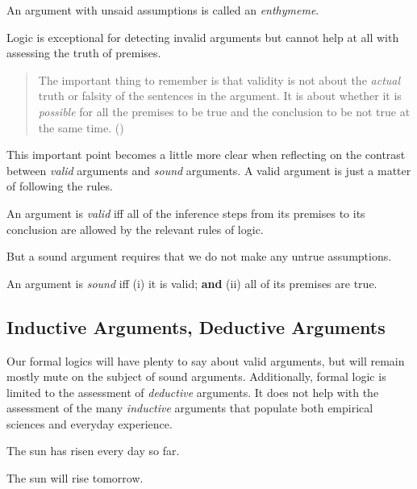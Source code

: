 \begin{definition}[Enthymeme]
  \label{def:enthymeme}
  An argument with unsaid assumptions is called an \emph{enthymeme}.
\end{definition}

Logic is exceptional for detecting invalid arguments but cannot help at all with
assessing the truth of premises.

\begin{quote}
  The important thing to remember is that validity is not about the
  \emph{actual} truth or falsity of the sentences in the argument. It is about
  whether it is \emph{possible} for all the premises to be true and the
  conclusion to be not true at the same time. (\cite[][p15]{Mag25})
\end{quote}

This important point becomes a little more clear when reflecting on the contrast
between \emph{valid} arguments and \emph{sound} arguments. A valid argument
is just a matter of following the rules.

\begin{definition}
  An argument is \emph{valid} iff all of the inference steps from its premises
  to its conclusion are allowed by the relevant rules of logic.
\end{definition}

But a sound argument requires that we do not make any untrue assumptions.

\begin{definition}
  An argument is \emph{sound} iff (i) it is valid; \textbf{and} (ii) all of
  its premises are true.
\end{definition}

\subsection{Inductive Arguments, Deductive Arguments}

Our formal logics will have plenty to say about valid arguments, but will remain
mostly mute on the subject of sound arguments. Additionally, formal logic is
limited to the assessment of \emph{deductive} arguments. It does not help with
the assessment of the many \emph{inductive} arguments that populate both
empirical sciences and everyday experience.

\begin{argument}
\item[] The sun has risen every day so far.
\item[\therefore] The sun will rise tomorrow.
\end{argument}

